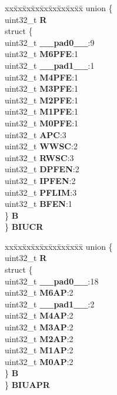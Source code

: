 \begin{DoxyCompactItemize}
\begin{tabbing}
\end{tabbing}\item 
\mbox{\label{structFLASH__tag_a0232f8817449783bb1eb2042347f6c97}} 
\begin{tabbing}
xx\=xx\=xx\=xx\=xx\=xx\=xx\=xx\=xx\=\kill
union \{\\
\>uint32\_t {\bfseries R}\\
\>struct \{\\
\>\>uint32\_t {\bfseries \_\_pad0\_\_}:9\\
\>\>uint32\_t {\bfseries M6PFE}:1\\
\>\>uint32\_t {\bfseries \_\_pad1\_\_}:1\\
\>\>uint32\_t {\bfseries M4PFE}:1\\
\>\>uint32\_t {\bfseries M3PFE}:1\\
\>\>uint32\_t {\bfseries M2PFE}:1\\
\>\>uint32\_t {\bfseries M1PFE}:1\\
\>\>uint32\_t {\bfseries M0PFE}:1\\
\>\>uint32\_t {\bfseries APC}:3\\
\>\>uint32\_t {\bfseries WWSC}:2\\
\>\>uint32\_t {\bfseries RWSC}:3\\
\>\>uint32\_t {\bfseries DPFEN}:2\\
\>\>uint32\_t {\bfseries IPFEN}:2\\
\>\>uint32\_t {\bfseries PFLIM}:3\\
\>\>uint32\_t {\bfseries BFEN}:1\\
\>\} {\bfseries B}\\
\} {\bfseries BIUCR}\\

\end{tabbing}\item 
\mbox{\label{structFLASH__tag_a94788d39d4e7fd798ae9be1e6b597bd3}} 
\begin{tabbing}
xx\=xx\=xx\=xx\=xx\=xx\=xx\=xx\=xx\=\kill
union \{\\
\>uint32\_t {\bfseries R}\\
\>struct \{\\
\>\>uint32\_t {\bfseries \_\_pad0\_\_}:18\\
\>\>uint32\_t {\bfseries M6AP}:2\\
\>\>uint32\_t {\bfseries \_\_pad1\_\_}:2\\
\>\>uint32\_t {\bfseries M4AP}:2\\
\>\>uint32\_t {\bfseries M3AP}:2\\
\>\>uint32\_t {\bfseries M2AP}:2\\
\>\>uint32\_t {\bfseries M1AP}:2\\
\>\>uint32\_t {\bfseries M0AP}:2\\
\>\} {\bfseries B}\\
\} {\bfseries BIUAPR}\\


\end{tabbing}
\end{DoxyCompactItemize}
